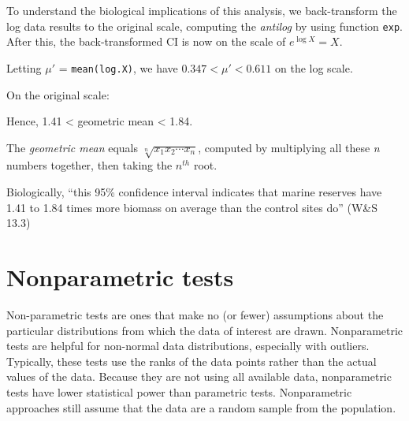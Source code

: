 \documentclass[]{book}
\newenvironment{Shaded}{\begin{snugshade}}{\end{snugshade}}
\newcommand{\CommentTok}[1]{\textcolor[rgb]{0.56,0.35,0.01}{\textit{#1}}}
\newcommand{\DataTypeTok}[1]{\textcolor[rgb]{0.13,0.29,0.53}{#1}}
\newcommand{\KeywordTok}[1]{\textcolor[rgb]{0.13,0.29,0.53}{\textbf{#1}}}
\newcommand{\NormalTok}[1]{#1}
\newcommand{\OperatorTok}[1]{\textcolor[rgb]{0.81,0.36,0.00}{\textbf{#1}}}
\newcommand{\StringTok}[1]{\textcolor[rgb]{0.31,0.60,0.02}{#1}}
\theoremstyle{definition}
\theoremstyle{definition}
\theoremstyle{definition}
\theoremstyle{remark}
\begin{document}
To understand the biological implications of this analysis, we
back-transform the log data results to the original scale, computing the
\emph{antilog} by using function \texttt{exp}. After this, the
back-transformed CI is now on the scale of \(e^{\log X} = X\).

Letting \(\mu'\) = \texttt{mean(log.X)}, we have
\(0.347 < \mu' < 0.611\) on the log scale.

On the original scale:

\begin{Shaded}
\end{Shaded}

Hence, 1.41 \textless{} geometric mean \textless{} 1.84.

The \emph{geometric mean} equals \(\sqrt[n]{x_1 x_2 \cdots x_n}\),
computed by multiplying all these \emph{n} numbers together, then taking
the \(n^{th}\) root.

Biologically, ``this 95\% confidence interval indicates that marine
reserves have 1.41 to 1.84 times more biomass on average than the
control sites do'' (W\&S 13.3)

\hypertarget{nonparametric-tests}{%
\section{Nonparametric tests}\label{nonparametric-tests}}

Non-parametric tests are ones that make no (or fewer) assumptions about
the particular distributions from which the data of interest are drawn.
Nonparametric tests are helpful for non-normal data distributions,
especially with outliers. Typically, these tests use the ranks of the
data points rather than the actual values of the data. Because they are
not using all available data, nonparametric tests have lower statistical
power than parametric tests. Nonparametric approaches still assume that
the data are a random sample from the population.
\end{document}
